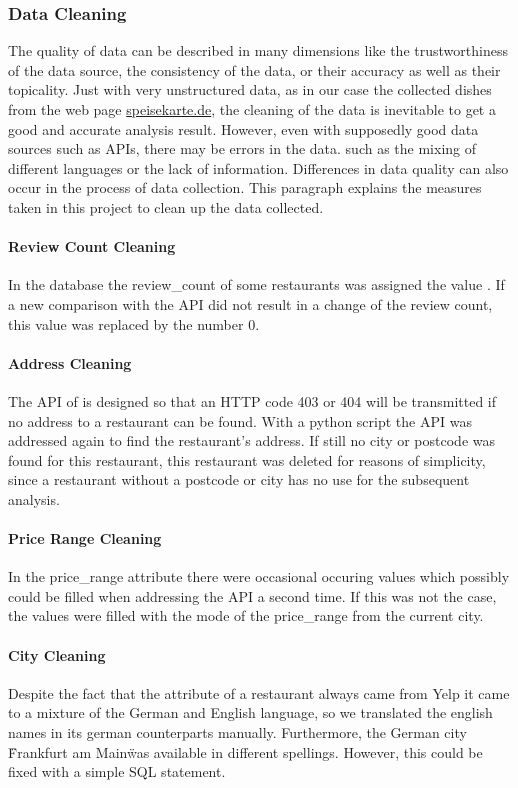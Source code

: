 \subsubsection{Data Cleaning}
\label{subsubsec:cleaning}
The quality of data can be described in many dimensions like \eg{} the trustworthiness of the data source, the consistency of the data,
or their accuracy as well as their topicality.
Just with very unstructured data, as in our case the collected dishes from the web page \url{speisekarte.de}, the cleaning of the data is
inevitable to get a good and accurate analysis result.
However, even with supposedly good data sources such as \acp{API}, there may be errors in the data.
such as \eg{} the mixing of different languages or the lack of information.
Differences in data quality can also occur in the process of data collection.
\newline
This paragraph explains the measures taken in this project to clean up the data collected.
\paragraph{Review Count Cleaning}
In the \pg{} database the review\_count of some restaurants was assigned the value .
If a new comparison with the \ylp{} \ac{API} did not result in a change of the review count,
this  value was replaced by the number 0.
\paragraph{Address Cleaning}
The \ac{API} of \ylp{} is designed so that an HTTP code 403 or 404 will be transmitted if no address to a restaurant
can be found.
With a python script the \ylp{} \ac{API} was addressed again to find the restaurant's address.
If still no city or postcode was found for this restaurant, this restaurant was deleted for reasons of simplicity,
since a restaurant without a postcode or city has no use for the subsequent analysis.
\paragraph{Price Range Cleaning}
In the price\_range attribute there were occasional occuring  values which possibly could be filled when addressing the \ylp{} \ac{API} a second time.
If this was not the case, the  values were filled with the mode of the price\_range from the current city.
\paragraph{City Cleaning}
Despite the fact that the  attribute of a restaurant always came from Yelp it came to a mixture of the German and English language,
so we translated the english names in its german counterparts manually.
Furthermore, the German city \"Frankfurt am Main\" was available in different spellings.
However, this could be fixed with a simple \ac{SQL} statement.
